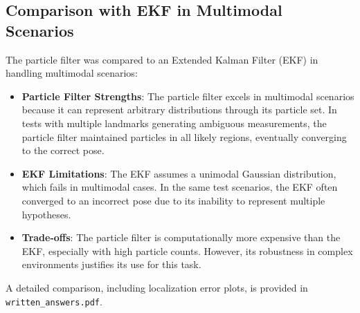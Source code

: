 \documentclass[11pt]{article}
\begin{document}
\subsection{Comparison with EKF in Multimodal Scenarios}
The particle filter was compared to an Extended Kalman Filter (EKF) in handling multimodal scenarios:
\begin{itemize}
    \item \textbf{Particle Filter Strengths}: The particle filter excels in multimodal scenarios because it can represent arbitrary distributions through its particle set. In tests with multiple landmarks generating ambiguous measurements, the particle filter maintained particles in all likely regions, eventually converging to the correct pose.
    \item \textbf{EKF Limitations}: The EKF assumes a unimodal Gaussian distribution, which fails in multimodal cases. In the same test scenarios, the EKF often converged to an incorrect pose due to its inability to represent multiple hypotheses.
    \item \textbf{Trade-offs}: The particle filter is computationally more expensive than the EKF, especially with high particle counts. However, its robustness in complex environments justifies its use for this task.
\end{itemize}
A detailed comparison, including localization error plots, is provided in \texttt{written\_answers.pdf}.
\end{document}
